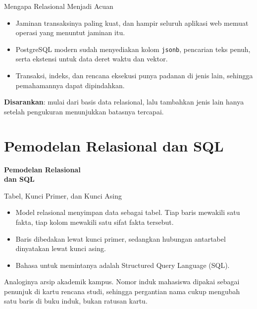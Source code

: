 \documentclass[aspectratio=169, table, 12pt]{beamer}
\begin{document}
\begin{frame}{{\Large Mengapa Relasional Menjadi Acuan}}
  \vspace{8pt}
  \begin{itemize}
    \item Jaminan transaksinya paling kuat, dan hampir seluruh aplikasi web
          memuat operasi yang menuntut jaminan itu.
    \item PostgreSQL modern sudah menyediakan kolom \texttt{jsonb}, pencarian
          teks penuh, serta ekstensi untuk data deret waktu dan vektor.
    \item Transaksi, indeks, dan rencana eksekusi punya padanan di jenis lain,
          sehingga pemahamannya dapat dipindahkan.
  \end{itemize}
  \vspace{8pt}
  {\footnotesize \textbf{Disarankan}: mulai dari basis data relasional,
  lalu tambahkan jenis lain hanya setelah pengukuran menunjukkan batasnya
  tercapai.}
\end{frame}

\section{Pemodelan Relasional dan SQL}

\begin{frame}{\hfill}
  \centering
  \Huge{\textbf{Pemodelan Relasional\\dan SQL}}
\end{frame}

\begin{frame}{{\Large Tabel, Kunci Primer, dan Kunci Asing}}
  \vspace{10pt}
  \begin{itemize}
    \item Model relasional menyimpan data sebagai tabel. Tiap baris mewakili
          satu fakta, tiap kolom mewakili satu sifat fakta tersebut.
    \item Baris dibedakan lewat kunci primer, sedangkan hubungan antartabel
          dinyatakan lewat kunci asing.
    \item Bahasa untuk memintanya adalah Structured Query Language (SQL).
  \end{itemize}
  \vspace{10pt}
  {\footnotesize Analoginya arsip akademik kampus. Nomor induk mahasiswa
  dipakai sebagai penunjuk di kartu rencana studi, sehingga pergantian nama
  cukup mengubah satu baris di buku induk, bukan ratusan kartu.}
\end{frame}
\end{document}
